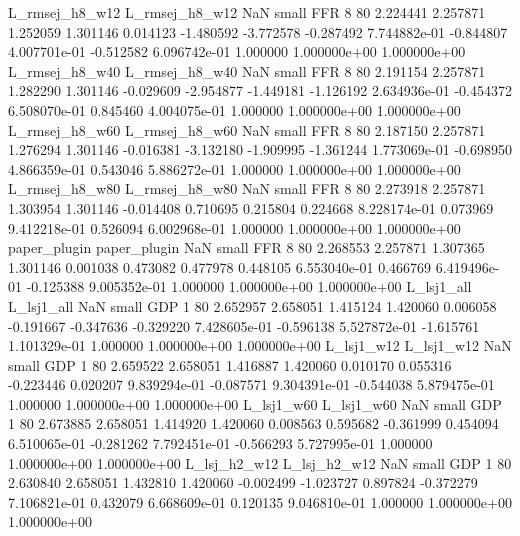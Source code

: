 L_rmsej_h8_w12 L_rmsej_h8_w12                   NaN      small      FFR                 8 80 2.224441       2.257871 1.252059       1.301146    0.014123     -1.480592     -3.772578    -0.287492   7.744882e-01 -0.844807 4.007701e-01    -0.512582   6.096742e-01            1.000000    1.000000e+00        1.000000e+00
L_rmsej_h8_w40 L_rmsej_h8_w40                   NaN      small      FFR                 8 80 2.191154       2.257871 1.282290       1.301146   -0.029609     -2.954877     -1.449181    -1.126192   2.634936e-01 -0.454372 6.508070e-01     0.845460   4.004075e-01            1.000000    1.000000e+00        1.000000e+00
L_rmsej_h8_w60 L_rmsej_h8_w60                   NaN      small      FFR                 8 80 2.187150       2.257871 1.276294       1.301146   -0.016381     -3.132180     -1.909995    -1.361244   1.773069e-01 -0.698950 4.866359e-01     0.543046   5.886272e-01            1.000000    1.000000e+00        1.000000e+00
L_rmsej_h8_w80 L_rmsej_h8_w80                   NaN      small      FFR                 8 80 2.273918       2.257871 1.303954       1.301146   -0.014408      0.710695      0.215804     0.224668   8.228174e-01  0.073969 9.412218e-01     0.526094   6.002968e-01            1.000000    1.000000e+00        1.000000e+00
  paper_plugin   paper_plugin                   NaN      small      FFR                 8 80 2.268553       2.257871 1.307365       1.301146    0.001038      0.473082      0.477978     0.448105   6.553040e-01  0.466769 6.419496e-01    -0.125388   9.005352e-01            1.000000    1.000000e+00        1.000000e+00
    L_lsj1_all     L_lsj1_all                   NaN      small      GDP                 1 80 2.652957       2.658051 1.415124       1.420060    0.006058     -0.191667     -0.347636    -0.329220   7.428605e-01 -0.596138 5.527872e-01    -1.615761   1.101329e-01            1.000000    1.000000e+00        1.000000e+00
    L_lsj1_w12     L_lsj1_w12                   NaN      small      GDP                 1 80 2.659522       2.658051 1.416887       1.420060    0.010170      0.055316     -0.223446     0.020207   9.839294e-01 -0.087571 9.304391e-01    -0.544038   5.879475e-01            1.000000    1.000000e+00        1.000000e+00
    L_lsj1_w60     L_lsj1_w60                   NaN      small      GDP                 1 80 2.673885       2.658051 1.414920       1.420060    0.008563      0.595682     -0.361999     0.454094   6.510065e-01 -0.281262 7.792451e-01    -0.566293   5.727995e-01            1.000000    1.000000e+00        1.000000e+00
  L_lsj_h2_w12   L_lsj_h2_w12                   NaN      small      GDP                 1 80 2.630840       2.658051 1.432810       1.420060   -0.002499     -1.023727      0.897824    -0.372279   7.106821e-01  0.432079 6.668609e-01     0.120135   9.046810e-01            1.000000    1.000000e+00        1.000000e+00
